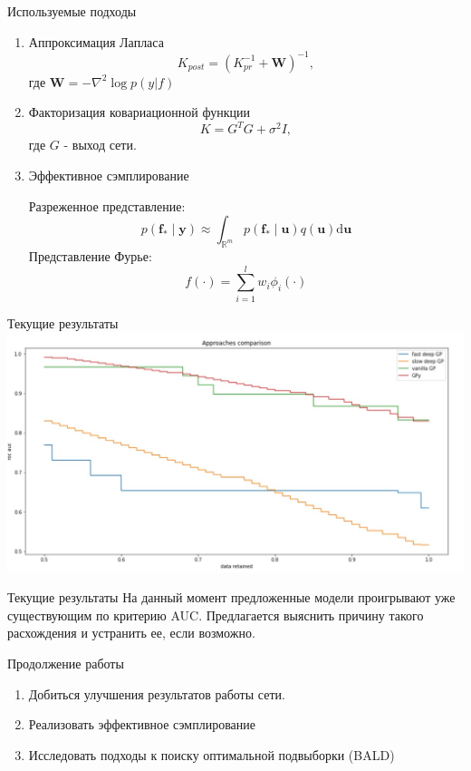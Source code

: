 \documentclass[hyperref={unicode}]{beamer}
\begin{document}
\begin{frame}{Используемые подходы}
\begin{enumerate}
    \item Аппроксимация Лапласа
    $$K_{post} = (K_{pr}^{-1} + \mathbf{W})^{-1},$$
    где $\mathbf{W} = -\nabla^2 \log p(y|f)$
    \item Факторизация ковариационной функции
    $$K = G^TG + \sigma^2 I,$$
    где $G$ - выход сети.
    \item Эффективное сэмплирование
    
    Разреженное представление:
    $$
p\left(\boldsymbol{f}_{*} \mid \boldsymbol{y}\right) \approx \int_{\mathbb{R}^{m}} p\left(\boldsymbol{f}_{*} \mid \boldsymbol{u}\right) q(\boldsymbol{u}) \mathrm{d} \boldsymbol{u}
$$
    Представление Фурье:
    $$
f(\cdot)=\sum_{i=1}^{l} w_{i} \phi_{i}(\cdot)
$$ 
\end{enumerate}
\end{frame}


\begin{frame}{Текущие результаты}
\includegraphics[width=\linewidth]{roc_auc.jpg}
\end{frame}

\begin{frame}{Текущие результаты}
На данный момент предложенные модели проигрывают уже существующим по критерию AUC. Предлагается выяснить причину такого расхождения и устранить ее, если возможно. 
\end{frame}


\begin{frame}{Продолжение работы}
\begin{enumerate}
    \item
	Добиться улучшения результатов работы сети.
	\item 
	Реализовать эффективное сэмплирование
	\item
	Исследовать подходы к поиску оптимальной подвыборки (BALD)
\end{enumerate}
\end{frame}

\end{document}
